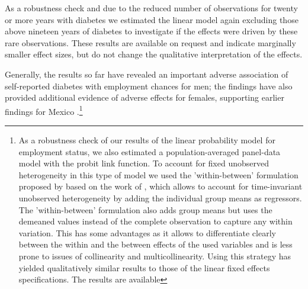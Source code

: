 \documentclass[12pt,english,british]{article}
\begin{document}
As a robustness check and due to the reduced number of observations for twenty or more years with diabetes we estimated the linear model again excluding those above nineteen years of diabetes to investigate if the effects were driven by these rare observations. These results are available on request and indicate marginally smaller effect sizes, but do not change the qualitative interpretation of the effects.

Generally, the results so far have revealed an important adverse association of self-reported diabetes with employment chances for men; the findings have also provided additional evidence of adverse effects for females, supporting earlier findings for Mexico \citep{Seuring2015}.\footnote{As  a robustness check of our results of the linear probability model for employment status, we also estimated a population-averaged panel-data model with the probit link function. To account for fixed unobserved heterogeneity in this type of model we used the 'within-between' formulation proposed by \citet{Bell2015} based on the work of \citet{Mundlak1978}, which allows to account for time-invariant unobserved heterogeneity by adding the individual group means as regressors. The 'within-between' formulation also adds group means but uses the demeaned values instead of the complete observation to capture any within variation. This has some advantages as it allows to differentiate clearly between the within and the between effects of the used variables and is less prone to issues of collinearity and multicollinearity. Using this
strategy has yielded qualitatively similar results to those of the
linear fixed effects specifications. The results are available
}
\end{document}
